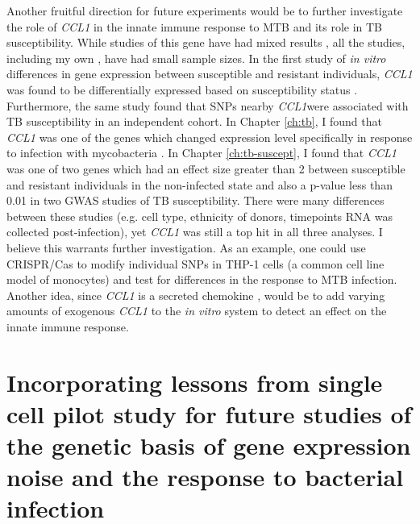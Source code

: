 Another fruitful direction for future experiments would be to further
investigate the role of \emph{CCL1} in the innate immune response to
MTB and its role in TB susceptibility. While studies of this gene have
had mixed results \citep{Thuong2008, Tang2011, Ozdemir2013},
all the studies, including my own \citep{Blischak2015}, have had small
sample sizes. In the first study of \emph{in vitro} differences in
gene expression between susceptible and resistant individuals,
\emph{CCL1} was found to be differentially expressed based on
susceptibility status \citep{Thuong2008}. Furthermore, the same study
found that SNPs nearby \emph{CCL1}were associated with TB
susceptibility in an independent cohort. In Chapter \ref{ch:tb}, I
found that \emph{CCL1} was one of the genes which changed expression
level specifically in response to infection with mycobacteria \citep{Blischak2015}. In
Chapter \ref{ch:tb-suscept}, I found that \emph{CCL1} was one of two
genes which had an effect size greater than 2 between susceptible and
resistant individuals in the non-infected state and also a p-value less
than 0.01 in two GWAS studies of TB susceptibility. There were many
differences between these studies (e.g. cell type, ethnicity of
donors, timepoints RNA was collected post-infection), yet \emph{CCL1}
was still a top hit in all three analyses. I believe this warrants
further investigation. As an example, one could use CRISPR/Cas \citep{Du2016} to
modify individual SNPs in THP-1 cells (a common cell line model of
monocytes) and test for differences in the response to MTB
infection. Another idea, since \emph{CCL1} is a secreted chemokine \citep{Miller1992},
would be to add varying amounts of exogenous \emph{CCL1} to the
\emph{in vitro} system to detect an effect on the innate immune
response.

\section{Incorporating lessons from single cell pilot study for future studies of the genetic basis of gene expression noise and the response to bacterial infection}

